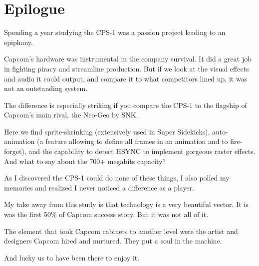 \chapter{Epilogue} 

Spending a year studying the CPS-1 was a passion project leading to an epiphany.

Capcom's hardware was instrumental in the company survival. It did a great job
in  fighting piracy and streamline production. But if we look at the visual effects and audio it could
output, and compare it to what competitors lined up, it was not an outstanding system.

The difference is especially striking if you compare the CPS-1 to the flagship of Capcom's
main rival, the Neo-Geo by SNK. 

Here we find sprite-shrinking (extensively used in Super Sidekicks),
auto-animation (a feature allowing to define all frames in an animation and to fire-forget), and
the capability to detect HSYNC to implement gorgeous raster effects. And what to say about the  700+ megabits capacity?

As I discovered the CPS-1 could do none of these things, I also polled my memories and realized 
I never noticed a difference as a player.

My take away from this study is that technology is a very beautiful vector. It is was the first 50\% of
Capcom success story. But it was not all of it.

The element that took Capcom cabinets to another level were the artist and designers Capcom hired and nurtured. 
They put a soul in the machine. 

And lucky us to have been there to enjoy it.

